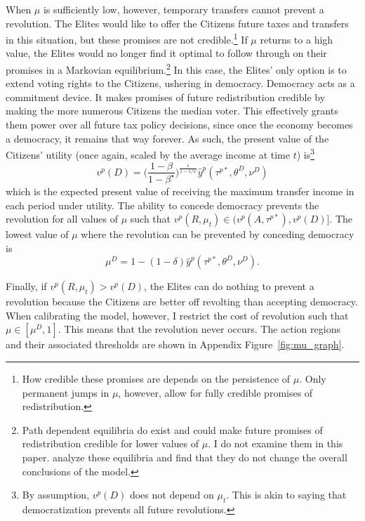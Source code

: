\documentclass[12pt]{article}
\numberwithin{equation}{section}
\begin{document}
When $\mu$ is sufficiently low, however, temporary transfers cannot prevent a revolution. The Elites would like to offer the Citizens future taxes and transfers in this situation, but these promises are not credible.\footnote{How credible these promises are depends on the persistence of $\mu$. Only permanent jumps in $\mu$, however, allow for fully credible promises of redistribution.} If $\mu$ returns to a high value, the Elites would no longer find it optimal to follow through on their promises in a Markovian equilibrium.\footnote{Path dependent equilibria do exist and could make future promises of redistribution credible for lower values of $\mu$. I do not examine them in this paper. \citet{Acemoglu2006} analyze these equilibria and find that they do not change the overall conclusions of the model.} In this case, the Elites' only option is to extend voting rights to the Citizens, ushering in democracy. Democracy acts as a commitment device. It makes promises of future redistribution credible by making the more numerous Citizens the median voter. This effectively grants them power over all future tax policy decisions, since once the economy becomes a democracy, it remains that way forever. As such, the present value of the Citizens' utility (once again, scaled by the average income at time $t$) is\footnote{By assumption, $v^{p}(D)$ does not depend on $\mu_t$. This is akin to saying that democratization prevents all future revolutions.}
\begin{equation}
v^{p}(D)=\bigg(\frac{1-\beta}{1-\beta^{\star}}\bigg)^{\frac{1}{1-1/\psi}}\hat{y}^{p} (\tau^{p*},\theta^{D},\nu^D)\label{eq:democracy}
\end{equation}
which is the expected present value of receiving the maximum transfer income in each period under \citeauthor{Epstein1989} utility. The ability to concede democracy prevents the revolution for all values of $\mu$ such that $v^p(R,\mu_{t}) \in (v^{p}(A,\tau^{p*}),v^{p}(D)]$. The lowest value of $\mu$ where the revolution can be prevented by conceding democracy is
\begin{equation}
\mu^{D} =1-(1-\delta)\hat{y}^{p} (\tau^{p*},\theta^{D},\nu^D).\label{eq:mudoublestar}
\end{equation}

Finally, if $v^p(R,\mu_{t}) > v^{p}(D)$, the Elites can do nothing to prevent a revolution because the Citizens are better off revolting than accepting democracy. When calibrating the model, however, I restrict the cost of revolution such that $\mu \in [\mu^{D},1]$. This means that the revolution never occurs. The action regions and their associated thresholds are shown in Appendix Figure~\ref{fig:mu_graph}.
\end{document}
